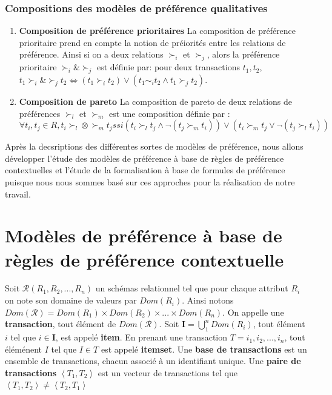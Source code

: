 \documentclass[a4paper,12pt,openany,oneside]{article}
\begin{document}
\subsubsection{Compositions des modèles de préférence qualitatives}
\begin{enumerate}

\item \textbf{Composition de préférence prioritaires}
La composition de préférence prioritaire prend en compte la notion de préiorités entre les relations de préférence. Ainsi si on a deux relations $\succ_i$ et $\succ_j$, alors la préférence prioritaire $\succ_i\&\succ_j$ est définie par: pour deux transactions $t_1,t_2$, $t_1\succ_i\&\succ_j t_2 \Leftrightarrow (t_1\succ_i t_2)\vee(t_1\sim_i t_2\wedge t_1\succ_j t_2)$.

\item \textbf{Composition de pareto}
La composition de pareto de deux relations de préférences $\succ_l$ et $\succ_m$ est une composition définie par :
\[
	\forall t_i,t_j\in R, t_i\succ_l\otimes\succ_m t_j ssi (t_i\succ_l t_j\wedge \neg (t_j\succ_m t_i))\vee(t_i\succ_m t_j\vee \neg(t_j\succ_l t_i))
\] 
\end{enumerate}




Après la decsriptions des différentes sortes de modèles de préférence, nous allons développer l'étude des modèles de préférence à base de règles de préférence contextuelles et l'étude de la formalisation à base de formules de préférence puisque nous nous sommes basé sur ces approches pour la réalisation de notre travail.


 
 \section{Modèles de préférence à base de règles de préférence contextuelle}
 	Soit $\mathcal{R}(R_{1},R_{2},...,R_{n})$ un schémas relationnel tel que pour chaque attribut $R_{i}$ on note son domaine de valeurs par $Dom(R_{i})$. 
	Ainsi notons $Dom(\mathcal{R})=Dom(R_{1})\times Dom(R_{2})\times ...\times Dom(R_{n})$. On appelle une \textbf{transaction}, tout élément de $Dom(\mathcal{R})$. 
	Soit $\mathbf{I}=\bigcup_{1}^{n}Dom(R_{i})$, tout élément $i$ tel que $i\in \mathbf{I}$, est appelé \textbf{item}.
	En prenant une transaction $T={i_1,i_2,...,i_n}$, tout éléménent $I$ tel que $I\in T$ est appelé \textbf{itemset}.
        Une \textbf{base de transactions} est un ensemble de transactions, chacun associé à un identifiant unique.	
	Une \textbf{paire de transactions} $\left<T_1,T_2\right>$ est un vecteur de transactions tel que $\left<T_1,T_2\right>\neq \left<T_2,T_1\right>$
 
\end{document}
